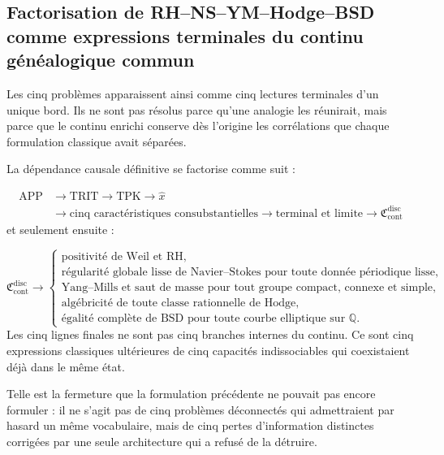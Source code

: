 \subsection{Factorisation de RH–NS–YM–Hodge–BSD comme expressions terminales du continu généalogique commun}
Les cinq problèmes apparaissent ainsi comme cinq lectures terminales d’un unique bord. Ils ne sont pas résolus parce qu’une analogie les réunirait, mais parce que le continu enrichi conserve dès l’origine les corrélations que chaque formulation classique avait séparées.\par
La dépendance causale définitive se factorise comme suit :\par
\[
\begin{aligned}
\mathrm{APP}
&\longrightarrow \mathrm{TRIT}
\longrightarrow \mathrm{TPK}
\longrightarrow \widehat x\\
&\longrightarrow \text{cinq caractéristiques consubstantielles}
\longrightarrow \text{terminal et limite}
\longrightarrow \mathfrak C_{\mathrm{cont}}^{\mathrm{disc}}
\end{aligned}
\]
et seulement ensuite :\par
\[
\mathfrak C_{\mathrm{cont}}^{\mathrm{disc}}
\longrightarrow
\begin{cases}
\text{positivité de Weil et RH},\\
\text{régularité globale lisse de Navier--Stokes pour toute donnée périodique lisse},\\
\text{Yang--Mills et saut de masse pour tout groupe compact, connexe et simple},\\
\text{algébricité de toute classe rationnelle de Hodge},\\
\text{égalité complète de BSD pour toute courbe elliptique sur }\mathbb Q.
\end{cases}
\]
Les cinq lignes finales ne sont pas cinq branches internes du continu. Ce sont cinq expressions classiques ultérieures de cinq capacités indissociables qui coexistaient déjà dans le même état.\par
Telle est la fermeture que la formulation précédente ne pouvait pas encore formuler : il ne s’agit pas de cinq problèmes déconnectés qui admettraient par hasard un même vocabulaire, mais de cinq pertes d’information distinctes corrigées par une seule architecture qui a refusé de la détruire.\par
